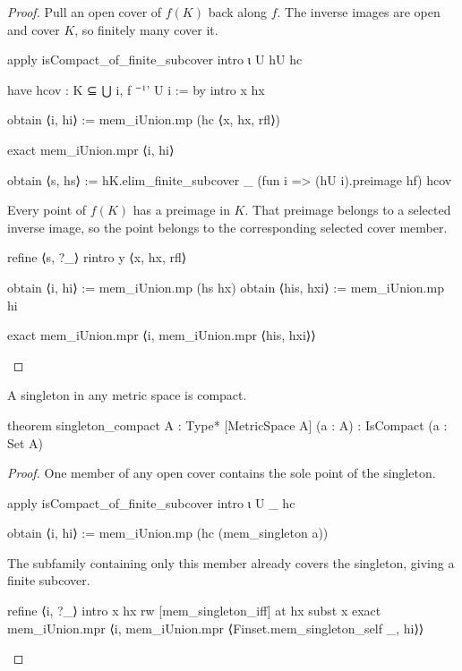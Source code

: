 \begin{proof}
  Pull an open cover of $f(K)$ back along $f$.
  The inverse images are open and cover $K$, so finitely many cover it.

  \begin{lean}
    apply isCompact_of_finite_subcover
    intro ι U hU hc

    have hcov : K ⊆ ⋃ i, f ⁻¹' U i := by
      intro x hx

      obtain ⟨i, hi⟩ := mem_iUnion.mp (hc ⟨x, hx, rfl⟩)

      exact mem_iUnion.mpr ⟨i, hi⟩

    obtain ⟨s, hs⟩ := hK.elim_finite_subcover _ (fun i => (hU i).preimage hf) hcov
  \end{lean}

  Every point of $f(K)$ has a preimage in $K$.
  That preimage belongs to a selected inverse image, so the point belongs to the corresponding
  selected cover member.

  \begin{lean}
    refine ⟨s, ?_⟩
    rintro y ⟨x, hx, rfl⟩

    obtain ⟨i, hi⟩ := mem_iUnion.mp (hs hx)
    obtain ⟨his, hxi⟩ := mem_iUnion.mp hi

    exact mem_iUnion.mpr ⟨i, mem_iUnion.mpr ⟨his, hxi⟩⟩
  \end{lean}

\end{proof}

\begin{lemma}
  \label{ma:lem:singleton-compact}
  A singleton in any metric space is compact.

  \begin{lean}
    theorem singleton_compact {A : Type*} [MetricSpace A] (a : A) :
        IsCompact ({a} : Set A)
  \end{lean}
\end{lemma}

\begin{proof}
  One member of any open cover contains the sole point of the singleton.

  \begin{lean}
    apply isCompact_of_finite_subcover
    intro ι U _ hc

    obtain ⟨i, hi⟩ := mem_iUnion.mp (hc (mem_singleton a))
  \end{lean}

  The subfamily containing only this member already covers the singleton, giving a finite
  subcover.

  \begin{lean}
    refine ⟨{i}, ?_⟩
    intro x hx
    rw [mem_singleton_iff] at hx
    subst x
    exact mem_iUnion.mpr ⟨i, mem_iUnion.mpr ⟨Finset.mem_singleton_self _, hi⟩⟩
  \end{lean}
\end{proof}

